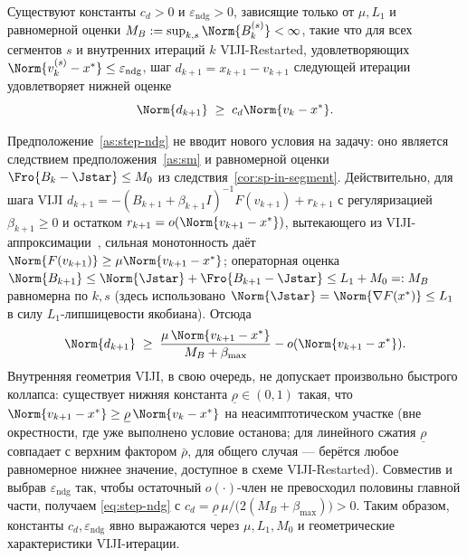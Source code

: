 \begin{assumption}
\label{as:step-ndg}
Существуют константы $c_d > 0$ и $\varepsilon_{\mathrm{ndg}} > 0$, зависящие
только от $\mu, L_1$ и равномерной оценки $M_B := \sup_{k, s}\Norm{B_k^{(s)}} < \infty$,
такие что для всех сегментов $s$ и внутренних итераций $k$ VIJI-Restarted,
удовлетворяющих $\Norm{v_k^{(s)} - x^{*}} \le \varepsilon_{\mathrm{ndg}}$,
шаг $d_{k+1} = x_{k+1} - v_{k+1}$ следующей итерации удовлетворяет нижней
оценке
\begin{equation}
\Norm{d_{k+1}} \;\ge\; c_d \Norm{v_k - x^{*}}.
\label{eq:step-ndg}
\end{equation}
\end{assumption}

\begin{remark}
\label{rem:step-ndg-sm}
Предположение~\ref{as:step-ndg} не вводит нового условия на задачу: оно
является следствием предположения~\ref{as:sm} и равномерной оценки
$\Fro{B_k - \Jstar} \le M_0$ из следствия~\ref{cor:sp-in-segment}. Действительно,
для шага VIJI $d_{k+1} = -(B_{k+1} + \beta_{k+1} I)^{-1} F(v_{k+1}) + r_{k+1}$
с регуляризацией $\beta_{k+1} \ge 0$ и остатком $r_{k+1} = o(\Norm{v_{k+1} - x^{*}})$,
вытекающего из VIJI-аппроксимации~\cite[Algorithm~1]{Agafonov2024VIJI},
сильная монотонность даёт $\Norm{F(v_{k+1})} \ge \mu\Norm{v_{k+1} - x^{*}}$;
операторная оценка $\Norm{B_{k+1}} \le \Norm{\Jstar} + \Fro{B_{k+1} - \Jstar} \le L_1 + M_0 =: M_B$
равномерна по $k, s$ (здесь использовано $\Norm{\Jstar} = \Norm{\nabla F(x^{*})} \le L_1$
в силу $L_1$-липшицевости якобиана). Отсюда
\[
\Norm{d_{k+1}}
\;\ge\; \frac{\mu\,\Norm{v_{k+1} - x^{*}}}{M_B + \beta_{\max}} - o(\Norm{v_{k+1} - x^{*}}).
\]
Внутренняя геометрия VIJI, в свою очередь, не допускает произвольно быстрого
коллапса: существует нижняя константа $\underline\rho \in (0, 1)$ такая, что
$\Norm{v_{k+1} - x^{*}} \ge \underline\rho\,\Norm{v_k - x^{*}}$ на неасимптотическом
участке (вне окрестности, где уже выполнено условие останова; для линейного
сжатия $\underline\rho$ совпадает с верхним фактором $\bar\rho$, для общего
случая --- берётся любое равномерное нижнее значение, доступное в схеме
VIJI-Restarted). Совместив и выбрав $\varepsilon_{\mathrm{ndg}}$ так, чтобы
остаточный $o(\cdot)$-член не превосходил половины главной части, получаем
\eqref{eq:step-ndg} с
$c_d = \underline\rho\,\mu/\bigl(2(M_B + \beta_{\max})\bigr) > 0$. Таким
образом, константы $c_d, \varepsilon_{\mathrm{ndg}}$ явно выражаются через
$\mu, L_1, M_0$ и геометрические характеристики VIJI-итерации.
\end{remark}

